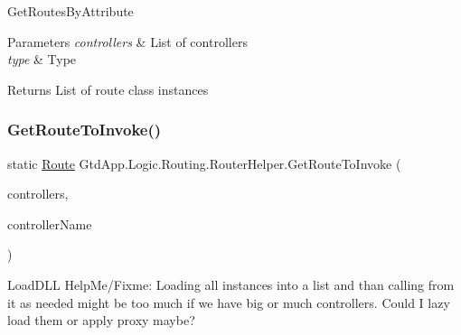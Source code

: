 Get\+Routes\+By\+Attribute 


\begin{DoxyParams}{Parameters}
{\em controllers} & List of controllers\\
\hline
{\em type} & Type\\
\hline
\end{DoxyParams}
\begin{DoxyReturn}{Returns}
List of route class instances
\end{DoxyReturn}
\mbox{\label{class_gtd_app_1_1_logic_1_1_routing_1_1_router_helper_ade163328e0a503113580b0d107a10fb4}} 
\subsubsection{\texorpdfstring{Get\+Route\+To\+Invoke()}{GetRouteToInvoke()}}
{\footnotesize\ttfamily static \mbox{\hyperlink{class_gtd_app_1_1_logic_1_1_routing_1_1_route}{Route}} Gtd\+App.\+Logic.\+Routing.\+Router\+Helper.\+Get\+Route\+To\+Invoke (\begin{DoxyParamCaption}\item[{List$<$ \mbox{\hyperlink{interface_gtd_app_1_1_logic_1_1_interfaces_1_1_i_controller}{I\+Controller}} $>$}]{controllers,  }\item[{string}]{controller\+Name }\end{DoxyParamCaption})\hspace{0.3cm}{\ttfamily [static]}}



Load\+D\+LL Help\+Me/\+Fixme\+: Loading all instances into a list and than calling from it as needed might be too much if we have big or much controllers. Could I lazy load them or apply proxy maybe? 


